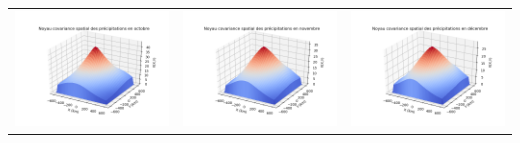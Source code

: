 \documentclass[a4paper,10pt]{article}
\begin{document}
\begin{tabular}{ccc}
	\includegraphics[scale=0.4]{images/kernel_precip_m10.png} & \includegraphics[scale=0.4]{images/kernel_precip_m11.png} & \includegraphics[scale=0.4]{images/kernel_precip_m12.png} \\
\end{tabular} 
\end{document}
